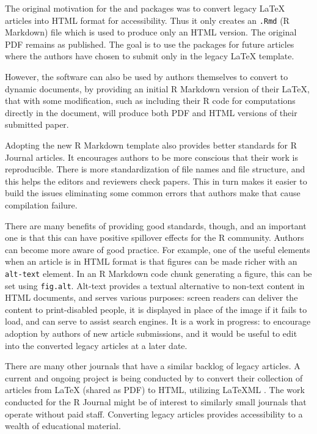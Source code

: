 The original motivation for the  and  packages was to convert legacy LaTeX articles into HTML format for accessibility. Thus it only creates an \texttt{.Rmd} (R Markdown) file which is used to produce only an HTML version. The original PDF remains as published. The goal is to use the packages for future articles where the authors have chosen to submit only in the legacy LaTeX template.

However, the software can also be used by authors themselves to convert to dynamic documents, by providing an initial R Markdown version of their LaTeX, that with some modification, such as including their R code for computations directly in the document, will produce both PDF and HTML versions of their submitted paper.

Adopting the new R Markdown template also provides better standards for R Journal articles. It encourages authors to be more conscious that their work is reproducible. There is more standardization of file names and file structure, and this helps the editors and reviewers check papers. This in turn makes it easier to build the issues eliminating some common errors that authors make that cause compilation failure.

There are many benefits of providing good standards, though, and an important one is that this can have positive spillover effects for the R community. Authors can become more aware of good practice. For example, one of the useful elements when an article is in HTML format is that figures can be made richer with an \texttt{alt-text} element. In an R Markdown code chunk generating a figure, this can be set using \texttt{fig.alt}. Alt-text provides a textual alternative to non-text content in HTML documents, and serves various purposes: screen readers can deliver the content to print-disabled people, it is displayed in place of the image if it fails to load, and can serve to assist search engines. It is a work in progress: to encourage adoption by authors of new article submissions, and it would be useful to edit into the converted legacy articles at a later date.

There are many other journals that have a similar backlog of legacy articles. A current and ongoing project is being conducted by \citet{arxiv} to convert their collection of articles from LaTeX (shared as PDF) to HTML, utilizing LaTeXML \citep{latexML}. The work conducted for the R Journal might be of interest to similarly small journals that operate without paid staff. Converting legacy articles provides accessibility to a wealth of educational material.

